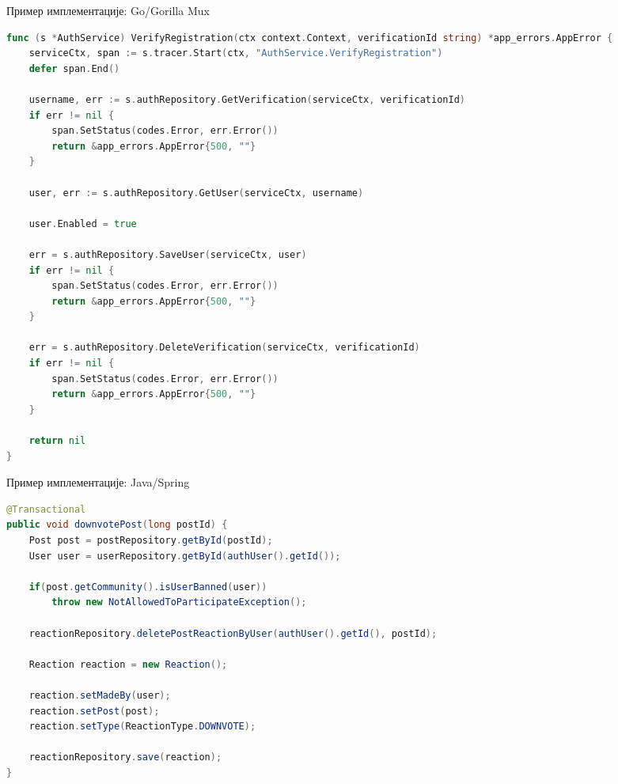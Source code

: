 \documentclass{beamer}
\begin{document}
    \begin{frame}[fragile]{Пример имплементације: Go/Gorilla Mux}
    	\begin{adjustbox}{width=\textwidth,height=\textheight,keepaspectratio}
			\begin{lstlisting}[language=go]
func (s *AuthService) VerifyRegistration(ctx context.Context, verificationId string) *app_errors.AppError {
	serviceCtx, span := s.tracer.Start(ctx, "AuthService.VerifyRegistration")
	defer span.End()

	username, err := s.authRepository.GetVerification(serviceCtx, verificationId)
	if err != nil {
		span.SetStatus(codes.Error, err.Error())
		return &app_errors.AppError{500, ""}
	}

	user, err := s.authRepository.GetUser(serviceCtx, username)

	user.Enabled = true

	err = s.authRepository.SaveUser(serviceCtx, user)
	if err != nil {
		span.SetStatus(codes.Error, err.Error())
		return &app_errors.AppError{500, ""}
	}

	err = s.authRepository.DeleteVerification(serviceCtx, verificationId)
	if err != nil {
		span.SetStatus(codes.Error, err.Error())
		return &app_errors.AppError{500, ""}
	}

	return nil
}
			\end{lstlisting}
		\end{adjustbox}
    \end{frame}
    
    \begin{frame}[fragile]{Пример имплементације: Java/Spring}
        \begin{adjustbox}{width=\textwidth,height=\textheight,keepaspectratio}
			\begin{lstlisting}[language=java]
@Transactional
public void downvotePost(long postId) {
    Post post = postRepository.getById(postId);
    User user = userRepository.getById(authUser().getId());

    if(post.getCommunity().isUserBanned(user))
        throw new NotAllowedToParticipateException();

    reactionRepository.deletePostReactionByUser(authUser().getId(), postId);

    Reaction reaction = new Reaction();

    reaction.setMadeBy(user);
    reaction.setPost(post);
    reaction.setType(ReactionType.DOWNVOTE);

    reactionRepository.save(reaction);
}
			\end{lstlisting}
		\end{adjustbox}
    \end{frame}
    
\end{document}

